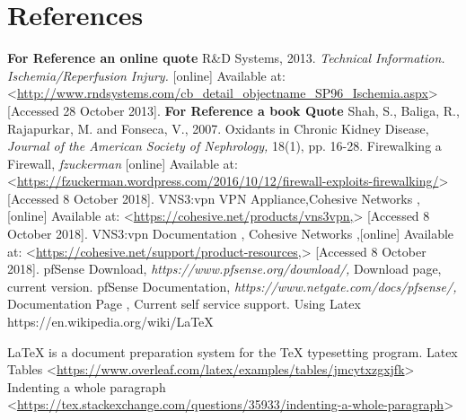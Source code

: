 \documentclass[12pt]{report}
\begin{document}
\section*{References}
\textbf{For Reference an online quote}
\newline
R\&D Systems, 2013. \textit{Technical Information. Ischemia/Reperfusion Injury.} [online] Available at: <\url{http://www.rndsystems.com/cb_detail_objectname_SP96_Ischemia.aspx}> [Accessed 28 October 2013].
\newline
\newline
\textbf{For Reference a book Quote}
\newline
Shah, S., Baliga, R., Rajapurkar, M. and Fonseca, V., 2007. Oxidants in Chronic Kidney Disease, \textit{Journal of the American Society of Nephrology,} 18(1), pp. 16-28.
\newline
\newline
Firewalking a Firewall, \textit{fzuckerman} [online] Available at: <\url{https://fzuckerman.wordpress.com/2016/10/12/firewall-exploits-firewalking/}> [Accessed 8 October 2018].
\newline
\newline
VNS3:vpn VPN Appliance,{Cohesive Networks} ,[online] Available at: <\url{https://cohesive.net/products/vns3vpn,}> [Accessed 8 October 2018].
\newline
\newline
VNS3:vpn Documentation , {Cohesive Networks} ,[online] Available at: <\url{https://cohesive.net/support/product-resources,}> [Accessed 8 October 2018].
\newline
\newline
pfSense Download, \textit{https://www.pfsense.org/download/,} Download page, current version.
\newline
\newline
pfSense Documentation, \textit{https://www.netgate.com/docs/pfsense/,} Documentation Page , Current self service support.
\newline
\newline
Using Latex
https://en.wikipedia.org/wiki/LaTeX
\newline
\newline
\maketitle
  \LaTeX{} is a document preparation system for
  the \TeX{} typesetting program.
Latex Tables
\newline
<\url{https://www.overleaf.com/latex/examples/tables/jmcytxzgxjfk}>
\newline
Indenting a whole paragraph
\newline
<\url{https://tex.stackexchange.com/questions/35933/indenting-a-whole-paragraph}>
\end{document}
